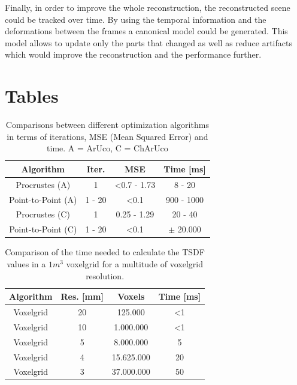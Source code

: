 \documentclass[10pt,twocolumn,letterpaper]{article}
\begin{document}
Finally, in order to improve the whole reconstruction, the reconstructed scene could be tracked over time. By using the temporal information and the deformations between the frames a canonical model could be generated. This model allows to update only the parts that changed as well as reduce artifacts which would improve the reconstruction and the performance further.

\newpage
\section{Tables}
\begin{table}[h!]
	\begin{center}
		\begin{tabular}{c|c|c|c}
			\textbf{Algorithm} & \textbf{Iter.} & \textbf{MSE} & \textbf{Time [ms]}\\
			\hline
			Procrustes (A)  & 1  & \textless 0.7 - 1.73 & 8 - 20\\
			Point-to-Point (A) & 1 - 20  & \textless 0.1 & 900 - 1000\\
			Procrustes (C) & 1  & 0.25 - 1.29 & 20 - 40\\
			Point-to-Point (C) & 1 - 20  & \textless 0.1 & $\pm$ 20.000\\
		\end{tabular}
		\caption{Comparisons between different optimization algorithms in terms of iterations, MSE (Mean Squared Error) and time. A = ArUco, C = ChArUco}
		\label{tab:camera-calibration}
	\end{center}
\end{table}

\begin{table}[h!]
	\begin{center}
		\begin{tabular}{c|c|c|c}
			\textbf{Algorithm} & \textbf{Res. [mm]} & \textbf{Voxels} & \textbf{Time [ms]}\\
			\hline
			Voxelgrid & 20 & 125.000 & \textless 1\\
			Voxelgrid & 10 & 1.000.000 & \textless 1\\
			Voxelgrid & 5 & 8.000.000 & 5\\
			Voxelgrid & 4 & 15.625.000 & 20\\
			Voxelgrid & 3 & 37.000.000 & 50\\
		\end{tabular}
		\caption{Comparison of the time needed to calculate the TSDF values in a $1m^3$ voxelgrid for a multitude of voxelgrid resolution.}
		\label{tab:voxelgrid}
	\end{center}
\end{table}
\end{document}
